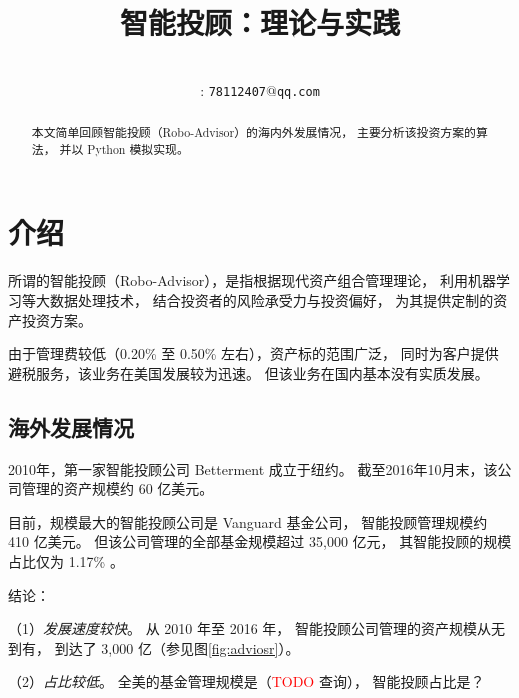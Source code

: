 \documentclass[a4paper, 11pt, UTF8]{report}
\begin{document}
\title{智能投顾：理论与实践}
\author{
         \\
        : \tt{78112407$@$qq.com}\\
        \vspace{0.5\textheight} \phantom{phan}}

\maketitle
\newpage
\pagestyle{empty}

\begin{abstract}    
        本文简单回顾智能投顾（Robo-Advisor）的海内外发展情况，
        主要分析该投资方案的算法，
        并以 Python 模拟实现。
\end{abstract}


\tableofcontents
\newpage

\pagestyle{plain}

\chapter{介绍}


所谓的智能投顾（Robo-Advisor），是指根据现代资产组合管理理论，
利用机器学习等大数据处理技术，
结合投资者的风险承受力与投资偏好，
为其提供定制的资产投资方案。

由于管理费较低（0.20\% 至 0.50\% 左右），资产标的范围广泛，
同时为客户提供避税服务，该业务在美国发展较为迅速。
但该业务在国内基本没有实质发展。

\section{海外发展情况}

2010年，第一家智能投顾公司 Betterment 成立于纽约。
截至2016年10月末，该公司管理的资产规模约 60 亿美元。

目前，规模最大的智能投顾公司是 Vanguard 基金公司，
智能投顾管理规模约 410 亿美元。
但该公司管理的全部基金规模超过 35,000 亿元，
其智能投顾的规模占比仅为 1.17\% 。

结论：

（1）\emph{发展速度较快}。
从 2010 年至 2016 年，
智能投顾公司管理的资产规模从无到有，
到达了 3,000 亿（参见图\ref{fig:adviosr}）。

（2）\emph{占比较低}。
全美的基金管理规模是（\textcolor{red}{TODO} 查询），
智能投顾占比是？
\end{document}
